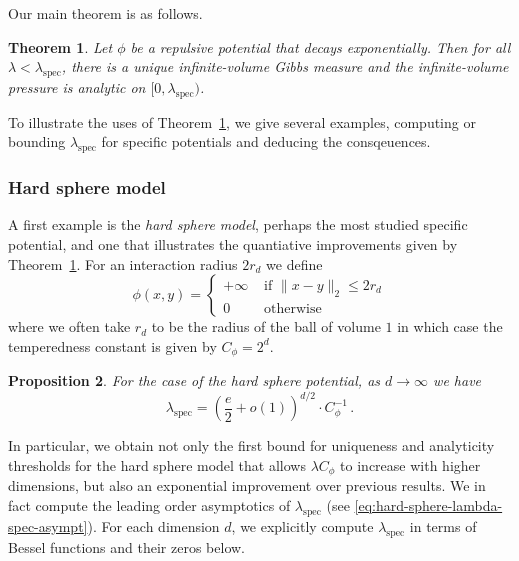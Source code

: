 \documentclass[10pt]{amsart}
\newtheorem{theorem}{Theorem}[section]
\newtheorem{proposition}[theorem]{Proposition}
\theoremstyle{definition}
\theoremstyle{remark}
\newcommand{\spec}{{\mathrm{spec}}}
\newcommand{\potential}{\phi}
\newcommand{\activity}{\lambda}
\begin{document}
	
	
	Our main theorem is as follows. 
	
	\begin{theorem}\label{thm:main}
		Let $\phi$ be a repulsive potential that decays exponentially.  Then for all $\lambda < \lambda_\spec$, there is a unique infinite-volume Gibbs measure and the infinite-volume pressure is analytic on $[0,\lambda_\spec)$.
	\end{theorem}
	
	{To illustrate the uses of Theorem~\ref{thm:main}, we give several examples, computing or bounding $\lambda_\spec$ for specific potentials and deducing the consqeuences.}
	
	\subsubsection{Hard sphere model}
	
	A first example is the \emph{hard sphere model}, {perhaps the most studied specific potential, and one that illustrates the quantiative improvements given by Theorem~\ref{thm:main}}.  For an interaction radius $2r_d$ we define \begin{equation} \label{eq:hard-sphere-potential}
		\phi(x,y) = \begin{cases}
			+\infty &\text{ if }\|x - y\|_2 \leq 2r_d \\
			0 &\text{ otherwise}
		\end{cases}
	\end{equation}
	where we often take $r_d$ to be the radius of the ball of volume $1$ in which case the temperedness constant is given by $C_\phi = 2^{d}$.    
	
	\begin{proposition}\label{prop:hard-spheres}
		For the case of the hard sphere potential, as $d \to \infty$ we have $$
		\lambda_\spec = \left(\frac{e}{2}+o(1)\right)^{d/2}\cdot C_\phi^{-1}\, .
		$$
	\end{proposition}
	
	In particular, we obtain not only the first bound for  uniqueness and analyticity thresholds for the hard sphere model that allows $\activity C_{\potential}$ to increase with higher dimensions, but also an exponential improvement over previous results.
	We in fact compute the leading order asymptotics of $\lambda_\spec$ (see \eqref{eq:hard-sphere-lambda-spec-asympt}).  For each dimension $d$, we explicitly compute $\lambda_\spec$ in terms of Bessel functions and their zeros below. 
	
\end{document}
